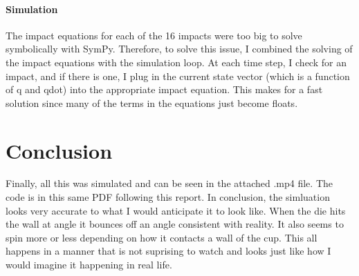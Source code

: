 \paragraph{Simulation}
The impact equations for each of the 16 impacts were too big to solve symbolically with SymPy. Therefore, to solve this issue, I combined the solving of the impact equations with the simulation 
loop. At each time step, I check for an impact, and if there is one, I plug in the current state vector (which is a function of q and qdot) into the appropriate impact equation. This makes for a 
fast solution since many of the terms in the equations just become floats.

\section{Conclusion}
Finally, all this was simulated and can be seen in the attached .mp4 file. The code is in this same PDF following this report. In conclusion, the simluation looks very accurate to what I would 
anticipate it to look like. When the die hits the wall at angle it bounces off an angle consistent with reality. It also seems to spin more or less depending on how it contacts a wall of the cup.
This all happens in a manner that is not suprising to watch and looks just like how I would imagine it happening in real life.

